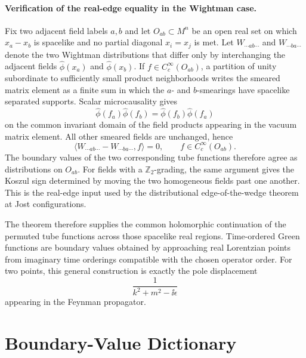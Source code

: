 \paragraph{Verification of the real-edge equality in the Wightman case.}
Fix two adjacent field labels \(a,b\) and let \(O_{ab}\subset M^n\) be an open
real set on which \(x_a-x_b\) is spacelike and no partial diagonal
\(x_i=x_j\) is met.  Let \(W_{\cdots ab\cdots}\) and
\(W_{\cdots ba\cdots}\) denote the two Wightman distributions that differ
only by interchanging the adjacent fields \(\widehat\phi(x_a)\) and
\(\widehat\phi(x_b)\).  If \(f\in C_c^\infty(O_{ab})\), a partition of unity
subordinate to sufficiently small product neighborhoods writes the smeared
matrix element as a finite sum in which the \(a\)- and \(b\)-smearings have
spacelike separated supports.  Scalar microcausality gives
\[
  \widehat\phi(f_a)\widehat\phi(f_b)
  =
  \widehat\phi(f_b)\widehat\phi(f_a)
\]
on the common invariant domain of the field products appearing in the
vacuum matrix element.  All other smeared fields are unchanged, hence
\[
  \langle W_{\cdots ab\cdots}-W_{\cdots ba\cdots},f\rangle=0,
  \qquad f\in C_c^\infty(O_{ab}).
\]
The boundary values of the two corresponding tube functions therefore agree
as distributions on \(O_{ab}\).  For fields with a \(\mathbb Z_2\)-grading,
the same argument gives the Koszul sign determined by moving the two
homogeneous fields past one another.  This is the real-edge input used by the
distributional edge-of-the-wedge theorem at Jost configurations.

The theorem therefore supplies the common holomorphic continuation of the
permuted tube functions across those spacelike real regions.  Time-ordered
Green functions are boundary values obtained by approaching real Lorentzian
points from imaginary time orderings compatible with the chosen operator
order.  For two points, this general construction is exactly the pole
displacement
\[
  \frac1{k^2+m^2-\ii\epsilon}
\]
appearing in the Feynman propagator.

\section{Boundary-Value Dictionary}


